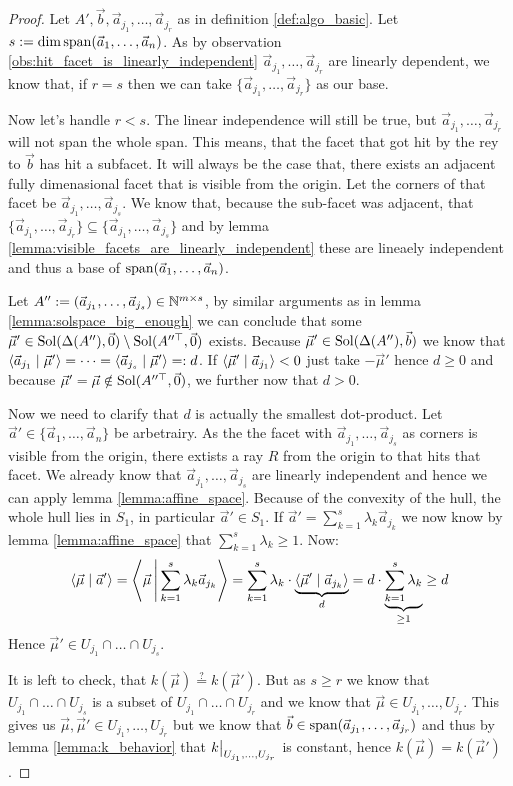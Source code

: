 \begin{proof}
    Let $A', \vec b, \vec a_{j_1}, \dots, \vec a_{j_r}$ as in definition \ref{def:algo_basic}. Let $s := \dim\operatorname{span}(\vec a_1, \dots, \vec a_n)$. As by observation \ref{obs:hit_facet_is_linearly_independent} $\vec a_{j_1}, \dots, \vec a_{j_r}$ are linearly dependent, we know that, if $r = s$ then we can take $\{\vec a_{j_1}, \dots, \vec a_{j_r}\}$ as our base.
    
    Now let's handle $r < s$. The linear independence will still be true, but $\vec a_{j_1}, \dots, \vec a_{j_r}$ will not span the whole span. This means, that the facet that got hit by the rey to $\vec b$ has hit a subfacet. It will always be the case that, there exists an adjacent fully dimenasional facet that is visible from the origin. Let the corners of that facet be $\vec a_{j_1}, \dots, \vec a_{j_s}$. We know that, because the sub-facet was adjacent, that $\{\vec a_{j_1}, \dots, \vec a_{j_r}\} \subseteq \{\vec a_{j_1}, \dots, \vec a_{j_s}\}$ and by lemma \ref{lemma:visible_facets_are_linearly_independent} these are lineaely independent and thus a base of $\operatorname{span}(\vec a_1, \dots, \vec a_n)$. 

    Let $A'' := (\vec a_{j_1}, \dots, \vec a_{j_s}) \in \mathbb{N}^{m\times s}$, by similar arguments as in lemma \ref{lemma:solspace_big_enough} we can conclude that some $\vec\mu' \in \operatorname{Sol}(\Delta(A''), \vec 0) \setminus \operatorname{Sol}(A''^\top, \vec 0)$ exists. Because $\vec\mu' \in \operatorname{Sol}(\Delta(A''), \vec b)$ we know that $\langle \vec a_{j_1} \mid \vec\mu' \rangle = \dots = \langle \vec a_{j_s} \mid \vec\mu' \rangle =: d$. If $\langle \vec\mu' \mid \vec a_{j_1} \rangle < 0$ just take $-\vec\mu'$ hence $d \geq 0$ and because $\vec\mu' = \vec\mu \notin \operatorname{Sol}(A''^\top, \vec 0)$, we further now that $d > 0$.

    Now we need to clarify that $d$ is actually the smallest dot-product. Let $\vec a' \in \{\vec a_1, \dots, \vec a_n\}$ be arbetrairy. As the the facet with $\vec a_{j_1}, \dots, \vec a_{j_s}$ as corners is visible from the origin, there extists a ray $R$ from the origin to that hits that facet. We already know that $\vec a_{j_1}, \dots, \vec a_{j_s}$ are linearly independent and hence we can apply lemma \ref{lemma:affine_space}. Because of the convexity of the hull, the whole hull lies in $S_1$, in particular $\vec a' \in S_1$. If $\vec a' = \sum_{k=1}^s \lambda_k \vec a_{j_k}$ we now know by lemma \ref{lemma:affine_space} that $\sum_{k=1}^s \lambda_k \geq 1$. Now:
    $$\langle \vec\mu \mid \vec a' \rangle = \left\langle \vec\mu \,\middle|\, \sum_{k=1}^s \lambda_k \vec a_{j_k} \right\rangle = \sum_{k=1}^s\lambda_k \cdot \underbrace{\langle \vec\mu' \mid \vec a_{j_k} \rangle}_d = d\cdot \underbrace{\sum_{k=1}^s\lambda_k}_{\geq 1} \geq d$$
    Hence $\vec\mu' \in U_{j_1} \cap \dots \cap U_{j_s}$. 
    
    It is left to check, that $k(\vec\mu) \stackrel{?}{=} k(\vec\mu')$. But as $s \geq r$ we know that $U_{j_1} \cap \dots \cap U_{j_s}$ is a subset of $U_{j_1} \cap \dots \cap U_{j_r}$ and we know that $\vec\mu \in U_{j_1}, \dots, U_{j_r}$. This gives us $\vec\mu, \vec\mu' \in U_{j_1}, \dots, U_{j_r}$ but we know that $\vec b \in \operatorname{span}(\vec a_{j_1}, \dots, \vec a_{j_r})$ and thus by lemma \ref{lemma:k_behavior} that $\restrict{k}{U_{j_1}, \dots, U_{j_r}}$ is constant, hence $k(\vec\mu) = k(\vec\mu')$.
\end{proof}

